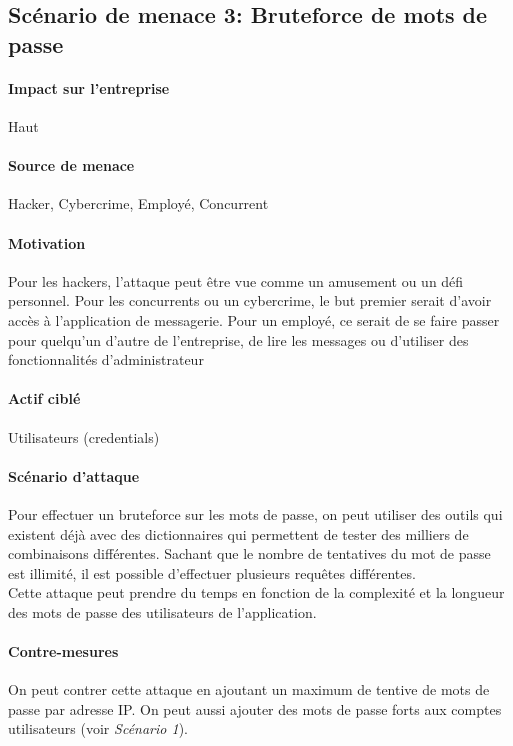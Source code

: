 \documentclass[a4paper,10pt]{article}
\begin{document}
    \subsection*{Scénario de menace 3: Bruteforce de mots de passe}
        \paragraph{Impact sur l'entreprise} Haut
        \paragraph{Source de menace} Hacker, Cybercrime, Employé, Concurrent
        \paragraph{Motivation}  Pour les hackers, l'attaque peut être vue comme un amusement ou un défi personnel. Pour les concurrents ou un cybercrime, le but premier serait d’avoir accès à l’application de messagerie. Pour un employé, ce serait de se faire passer pour quelqu’un d’autre de l’entreprise, de lire les messages ou d’utiliser des fonctionnalités d’administrateur
        \paragraph{Actif ciblé} Utilisateurs (credentials)
        \paragraph{Scénario d'attaque}
        Pour effectuer un bruteforce sur les mots de passe, on peut utiliser des outils qui existent déjà avec des dictionnaires qui permettent de tester des milliers de combinaisons différentes. Sachant que le nombre de tentatives du mot de passe est illimité, il est possible d'effectuer plusieurs requêtes différentes. \\
        
        Cette attaque peut prendre du temps en fonction de la complexité et la longueur des mots de passe des utilisateurs de l'application.
        \paragraph{Contre-mesures}
        On peut contrer cette attaque en ajoutant un maximum de tentive de mots de passe par adresse IP. On peut aussi ajouter des mots de passe forts aux comptes utilisateurs (voir \textit{Scénario 1}).
\end{document}
